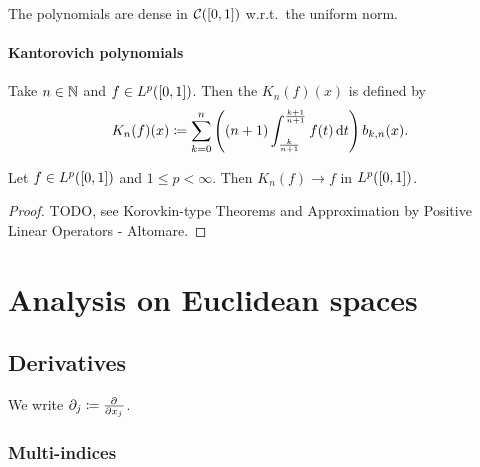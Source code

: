 \begin{corollary}
The polynomials are dense in $\cont(\interval{0,1})$ w.r.t.\ the uniform norm.
\end{corollary}

\subsubsection{Kantorovich polynomials}
\begin{definition}
Take $n\in \mathbb{N}$ and $f\in L^p(\interval{0,1})$. Then the  $K_n(f)(x)$ is defined by
\[ K_n(f)(x) \coloneqq \sum_{k=0}^n\left((n+1)\int_{\frac{k}{n+1}}^{\frac{k+1}{n+1}}f(t)\operatorname{d \!}{t}\right)b_{k,n}(x). \]
\end{definition}

\begin{proposition}
Let $f\in L^p(\interval{0,1})$ and $1\leq p <\infty$. Then $K_n(f) \to f$ in $L^p(\interval{0,1})$.
\end{proposition}
\begin{proof}
TODO, see Korovkin-type Theorems and Approximation by Positive Linear Operators - Altomare.
\end{proof}

\chapter{Analysis on Euclidean spaces}
\section{Derivatives}
\begin{definition}
We write $\partial_j \coloneqq  \frac{\partial{^{}}}{\partial{{x_j}^{}}} $.
\end{definition}

\subsection{Multi-indices}


